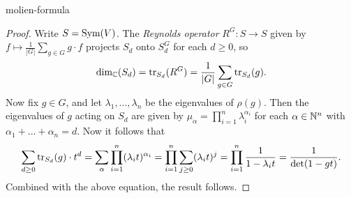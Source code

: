 \begin{example}{molien-formula}
    \begin{proof}
        Write $S = \textup{Sym}(V)$. The \textit{Reynolds operator} $R^G \colon S \to S$ given by $f \mapsto \frac{1}{|G|} \sum_{g \in G} g \cdot f$ projects $S_d$ onto $S^G_d$ for each $d \ge 0$, so
        \[ \dim_{\mathbb{C}}(S_d) = \operatorname{tr}_{S_d}(R^G) = \frac{1}{|G|} \sum_{g \in G} \operatorname{tr}_{S_d}(g) . \]
        Now fix $g \in G$, and let $\lambda_1, \ldots, \lambda_n$ be the eigenvalues of $\rho(g)$. Then the eigenvalues of $g$ acting on $S_d$ are given by $\mu_\alpha = \prod_{i = 1}^{n} \lambda_i^{\alpha_i}$ for each $\alpha \in \mathbb{N}^n$ with $\alpha_1 + \ldots + \alpha_n = d$. Now it follows that
        \[ \sum_{d \ge 0} \operatorname{tr}_{S_d}(g) \cdot t^d = \sum_{\alpha} \prod_{i = 1}^{n} (\lambda_i t)^{\alpha_i} = \prod_{i = 1}^{n} \sum_{j \ge 0} (\lambda_i t)^j = \prod_{i = 1}^{n} \frac{1}{1 - \lambda_i t} = \frac{1}{\det(1 - gt)} . \]
        Combined with the above equation, the result follows.
    \end{proof}
\end{example}
